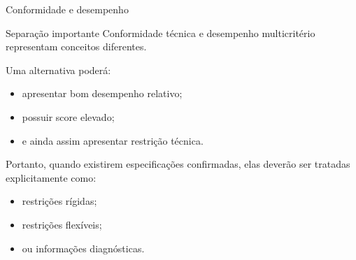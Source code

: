 \begin{frame}{Conformidade e desempenho}

    \begin{block}{Separação importante}
        Conformidade técnica e desempenho multicritério representam
        conceitos diferentes.
    \end{block}

    \vspace{0.4cm}

    Uma alternativa poderá:

    \begin{itemize}
        \item apresentar bom desempenho relativo;
        \item possuir score elevado;
        \item e ainda assim apresentar restrição técnica.
    \end{itemize}

    \vspace{0.3cm}

    Portanto, quando existirem especificações confirmadas, elas
    deverão ser tratadas explicitamente como:

    \begin{itemize}
        \item restrições rígidas;
        \item restrições flexíveis;
        \item ou informações diagnósticas.
    \end{itemize}

\end{frame}



